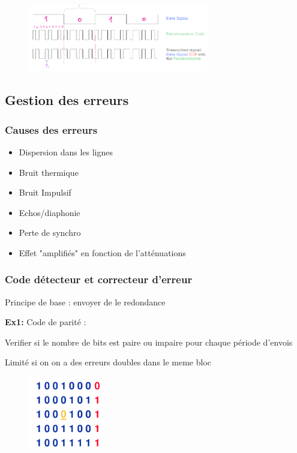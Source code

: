 			\begin{figure}[htp]
				\centering
				\includegraphics[width=0.7\textwidth]{img/CDMA.png}
			\end{figure}
			
	\subsection{Gestion des erreurs}
		\subsubsection{Causes des erreurs}
			\begin{itemize}
				\item Dispersion dans les lignes
				\item Bruit thermique
				\item Bruit Impulsif
				\item Echos/diaphonie
				\item Perte de synchro
				\item Effet "amplifiés" en fonction de l'atténuations
			\end{itemize}
			
		\subsubsection{Code détecteur et correcteur d'erreur}
		
			Principe de base : envoyer de le redondance
			
			\textbf{Ex1:} Code de parité :
				
				Verifier si le nombre de bits est paire ou impaire pour chaque période d'envois
				
				Limité si on on a des erreurs doubles dans le meme bloc
				
				\begin{figure}[htp]
					\centering
					\includegraphics[width=0.3\textwidth]{img/Erreur.png}
				\end{figure}
				
